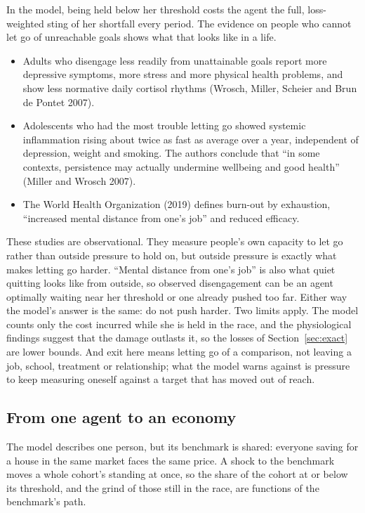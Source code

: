 \documentclass[12pt]{article}
\theoremstyle{definition}
\theoremstyle{remark}
\theoremstyle{plain}
\theoremstyle{definition}
\begin{document}
In the model, being held below her threshold costs the agent the full, loss-weighted sting of her shortfall every period. The evidence on people who cannot let go of unreachable goals shows what that looks like in a life.
\begin{itemize}
\item Adults who disengage less readily from unattainable goals report more depressive symptoms, more stress and more physical health problems, and show less normative daily cortisol rhythms (Wrosch, Miller, Scheier and Brun de Pontet 2007).
\item Adolescents who had the most trouble letting go showed systemic inflammation rising about twice as fast as average over a year, independent of depression, weight and smoking. The authors conclude that ``in some contexts, persistence may actually undermine wellbeing and good health'' (Miller and Wrosch 2007).
\item The World Health Organization (2019) defines burn-out by exhaustion, ``increased mental distance from one's job'' and reduced efficacy.
\end{itemize}
These studies are observational. They measure people's own capacity to let go rather than outside pressure to hold on, but outside pressure is exactly what makes letting go harder. ``Mental distance from one's job'' is also what quiet quitting looks like from outside, so observed disengagement can be an agent optimally waiting near her threshold or one already pushed too far. Either way the model's answer is the same: do not push harder. Two limits apply. The model counts only the cost incurred while she is held in the race, and the physiological findings suggest that the damage outlasts it, so the losses of Section~\ref{sec:exact} are lower bounds. And exit here means letting go of a comparison, not leaving a job, school, treatment or relationship; what the model warns against is pressure to keep measuring oneself against a target that has moved out of reach.

\subsection{From one agent to an economy}\label{sec:aggregate}

The model describes one person, but its benchmark is shared: everyone saving for a house in the same market faces the same price. A shock to the benchmark moves a whole cohort's standing at once, so the share of the cohort at or below its threshold, and the grind of those still in the race, are functions of the benchmark's path.
\end{document}
